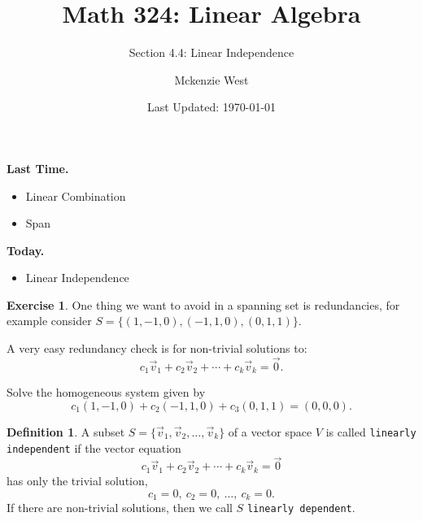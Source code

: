 \documentclass{beamer}
\newcommand{\fn}{\insertframenumber}
\theoremstyle{definition}
\newtheorem{exercise}{Exercise}
\newtheorem*{defn}{Definition}
\renewcommand{\emph}[1]{{\color{blue}\texttt{#1}}}
\begin{document}
	\title{Math 324: Linear Algebra}
	\subtitle{Section 4.4: Linear Independence}
	\author{Mckenzie West}
	\date{Last Updated: \today}
\begin{frame}
\maketitle
\end{frame}

\begin{frame}{\insertframenumber}
	\begin{block}{\textbf{Last Time.}}
	\begin{itemize}[label=--]
		\item Linear Combination
		\item Span
	\end{itemize}
	\end{block}
	\begin{block}{\textbf{Today.}}
		\begin{itemize}[label=--]
			\item Linear Independence
		\end{itemize}
	\end{block}
\end{frame}
\begin{frame}{\fn}
\begin{exercise}
	One thing we want to avoid in a spanning set is redundancies, for example consider $S=\{(1,-1,0),(-1,1,0),(0,1,1)\}$. 
	
	A very easy redundancy check is for non-trivial solutions to:
	\[c_1\vec v_1+c_2\vec v_2+\cdots + c_k\vec v_k=\vec 0.\]
	
	Solve the homogeneous system given by
		\[c_1(1,-1,0)+c_2(-1,1,0)+c_3(0,1,1)=(0,0,0).\]
\end{exercise}
\end{frame}
\begin{frame}{\fn}
\begin{defn}
	A subset $S=\{\vec v_1,\vec v_2,\dots,\vec v_k\}$ of a vector space $V$ is called \emph{linearly independent} if the vector equation
	\[c_1\vec v_1+c_2\vec v_2+\cdots+c_k\vec v_k=\vec 0\]
	has only the trivial solution,
	\[c_1=0,\ c_2=0,\ \dots,\ c_k=0.\]
	If there are non-trivial solutions, then we call $S$ \emph{linearly~dependent}.
\end{defn}
\end{frame}
\end{document}
